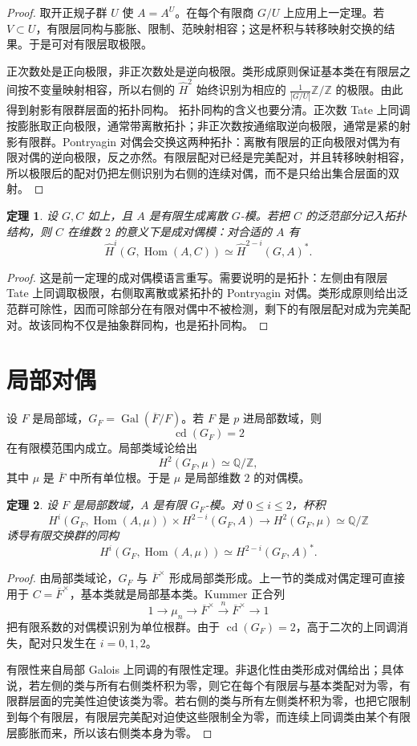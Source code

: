 \documentclass[11pt,a4paper,openany]{ctexbook}
\numberwithin{equation}{chapter}
\newcommand{\Q}{\mathbb{Q}}
\newcommand{\Z}{\mathbb{Z}}
\newcommand{\Gal}{\operatorname{Gal}}
\newcommand{\Hom}{\operatorname{Hom}}
\theoremstyle{plain}
\newtheorem{theorem}{定理}[chapter]
\theoremstyle{definition}
\theoremstyle{remark}
\begin{document}
\begin{proof}
取开正规子群 $U$ 使 $A=A^U$。在每个有限商 $G/U$ 上应用上一定理。若 $V\subset U$，有限层同构与膨胀、限制、范映射相容；这是杯积与转移映射交换的结果。于是可对有限层取极限。

正次数处是正向极限，非正次数处是逆向极限。类形成原则保证基本类在有限层之间按不变量映射相容，所以右侧的 $\widehat H^2$ 始终识别为相应的 $\frac1{|G/U|}\Z/\Z$ 的极限。由此得到射影有限群层面的拓扑同构。
拓扑同构的含义也要分清。正次数 Tate 上同调按膨胀取正向极限，通常带离散拓扑；非正次数按通缩取逆向极限，通常是紧的射影有限群。Pontryagin 对偶会交换这两种拓扑：离散有限层的正向极限对偶为有限对偶的逆向极限，反之亦然。有限层配对已经是完美配对，并且转移映射相容，所以极限后的配对仍把左侧识别为右侧的连续对偶，而不是只给出集合层面的双射。
\end{proof}

\begin{theorem}
设 $G,C$ 如上，且 $A$ 是有限生成离散 $G$-模。若把 $C$ 的泛范部分记入拓扑结构，则 $C$ 在维数 $2$ 的意义下是成对偶模：对合适的 $A$ 有
\[
\widehat H^i(G,\Hom(A,C))\simeq \widehat H^{2-i}(G,A)^*.
\]
\end{theorem}

\begin{proof}
这是前一定理的成对偶模语言重写。需要说明的是拓扑：左侧由有限层 Tate 上同调取极限，右侧取离散或紧拓扑的 Pontryagin 对偶。类形成原则给出泛范群可除性，因而可除部分在有限对偶中不被检测，剩下的有限层配对成为完美配对。故该同构不仅是抽象群同构，也是拓扑同构。
\end{proof}

\section{局部对偶}

设 $F$ 是局部域，$G_F=\Gal(\overline F/F)$。若 $F$ 是 $p$ 进局部数域，则
\[
\operatorname{cd}(G_F)=2
\]
在有限模范围内成立。局部类域论给出
\[
H^2(G_F,\mu)\simeq \Q/\Z,
\]
其中 $\mu$ 是 $\overline F$ 中所有单位根。于是 $\mu$ 是局部维数 $2$ 的对偶模。

\begin{theorem}
设 $F$ 是局部数域，$A$ 是有限 $G_F$-模。对 $0\leq i\leq 2$，杯积
\[
H^i(G_F,\Hom(A,\mu))\times H^{2-i}(G_F,A)
\longrightarrow H^2(G_F,\mu)\simeq \Q/\Z
\]
诱导有限交换群的同构
\[
H^i(G_F,\Hom(A,\mu))\simeq H^{2-i}(G_F,A)^*.
\]
\end{theorem}

\begin{proof}
由局部类域论，$G_F$ 与 $\overline F^\times$ 形成局部类形成。上一节的类成对偶定理可直接用于 $C=\overline F^\times$，基本类就是局部基本类。Kummer 正合列
\[
1\to \mu_n\to \overline F^\times\xrightarrow{n}\overline F^\times\to 1
\]
把有限系数的对偶模识别为单位根群。由于 $\operatorname{cd}(G_F)=2$，高于二次的上同调消失，配对只发生在 $i=0,1,2$。

有限性来自局部 Galois 上同调的有限性定理。非退化性由类形成对偶给出；具体说，若左侧的类与所有右侧类杯积为零，则它在每个有限层与基本类配对为零，有限群层面的完美性迫使该类为零。若右侧的类与所有左侧类杯积为零，也把它限制到每个有限层，有限层完美配对迫使这些限制全为零，而连续上同调类由某个有限层膨胀而来，所以该右侧类本身为零。
\end{proof}
\end{document}
